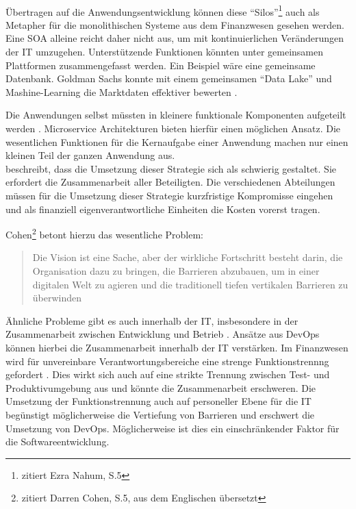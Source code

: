 \medskip
\\
Übertragen auf die Anwendungsentwicklung können diese \enquote{Silos}\footnote{\citet{Gupta:2017} zitiert Ezra Nahum, S.5} auch als Metapher für die monolithischen Systeme \cite{Bussmann2006} aus dem Finanzwesen gesehen werden. Eine \ac{SOA} alleine reicht daher nicht aus, um mit kontinuierlichen Veränderungen der IT umzugehen. Unterstützende Funktionen könnten unter gemeinsamen Plattformen zusammengefasst werden. Ein Beispiel wäre eine gemeinsame Datenbank. Goldman Sachs konnte mit einem gemeinsamen \enquote{Data Lake} und Mashine-Learning die Marktdaten effektiver bewerten \cite{Gupta:2017}.

Die Anwendungen selbst müssten in kleinere funktionale Komponenten aufgeteilt werden \cite{Bussmann2006}. Microservice Architekturen bieten hierfür einen möglichen Ansatz. Die wesentlichen Funktionen für die Kernaufgabe einer Anwendung machen nur einen kleinen Teil der ganzen Anwendung aus.
\medskip
\\
\citet{Gupta:2017} beschreibt, dass die Umsetzung dieser Strategie sich als schwierig gestaltet. Sie erfordert die Zusammenarbeit aller Beteiligten. Die verschiedenen Abteilungen müssen für die Umsetzung dieser Strategie kurzfristige Kompromisse eingehen und als finanziell eigenverantwortliche Einheiten die Kosten vorerst tragen. 

Cohen\footnote{\citet{Gupta:2017} zitiert Darren Cohen, S.5, aus dem Englischen übersetzt} betont hierzu das wesentliche Problem:
\begin{quote}\label{quote:goldman-vision}
    Die Vision ist eine Sache, aber der wirkliche Fortschritt besteht darin, die Organisation dazu zu bringen, die Barrieren abzubauen, um in einer digitalen Welt zu agieren und die traditionell tiefen vertikalen Barrieren zu überwinden
\end{quote}
\medskip
Ähnliche Probleme gibt es auch innerhalb der IT, insbesondere in der Zusammenarbeit zwischen Entwicklung und Betrieb \citet{Disterer2013}. Ansätze aus DevOps \cite{Alt2017} können hierbei die Zusammenarbeit innerhalb der IT verstärken. Im Finanzwesen wird für unvereinbare Verantwortungsbereiche eine strenge Funktionstrennng gefordert \cite{MaRisk:2017}.
Dies wirkt sich auch auf eine strikte Trennung zwischen Test- und Produktivumgebung aus \citet{MaRisk:2017} und könnte die Zusammenarbeit erschweren. Die Umsetzung der Funktionstrennung auch auf personeller Ebene für die IT begünstigt möglicherweise die Vertiefung von Barrieren und erschwert die Umsetzung von DevOps. Möglicherweise ist dies ein einschränkender Faktor für die Softwareentwicklung.


